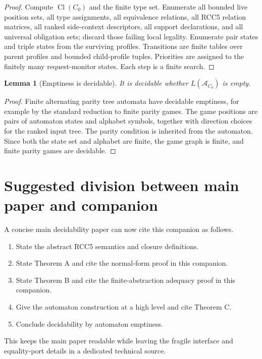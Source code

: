 \documentclass[11pt]{article}
\newtheorem{lemma}[theorem]{Lemma}
\newcommand{\Cl}{\operatorname{Cl}}
\newcommand{\Aut}{\mathcal A}
\begin{document}
\begin{proof}
Compute $\Cl(C_0)$ and the finite type set.  Enumerate all bounded live position sets, all type assignments, all equivalence relations, all RCC5 relation matrices, all ranked side-context descriptors, all support declarations, and all universal obligation sets; discard those failing local legality.  Enumerate pair states and triple states from the surviving profiles.  Transitions are finite tables over parent profiles and bounded child-profile tuples.  Priorities are assigned to the finitely many request-monitor states.  Each step is a finite search.
\end{proof}

\begin{lemma}[Emptiness is decidable]
It is decidable whether $L(\Aut_{C_0})$ is empty.
\end{lemma}

\begin{proof}
Finite alternating parity tree automata have decidable emptiness, for example by the standard reduction to finite parity games.  The game positions are pairs of automaton states and alphabet symbols, together with direction choices for the ranked input tree.  The parity condition is inherited from the automaton.  Since both the state set and alphabet are finite, the game graph is finite, and finite parity games are decidable.
\end{proof}

\section{Suggested division between main paper and companion}

A concise main decidability paper can now cite this companion as follows.
\begin{enumerate}[label=(M\arabic*)]
\item State the abstract RCC5 semantics and closure definitions.
\item State Theorem A and cite the normal-form proof in this companion.
\item State Theorem B and cite the finite-abstraction adequacy proof in this companion.
\item Give the automaton construction at a high level and cite Theorem C.
\item Conclude decidability by automaton emptiness.
\end{enumerate}
This keeps the main paper readable while leaving the fragile interface and equality-port details in a dedicated technical source.
\end{document}
